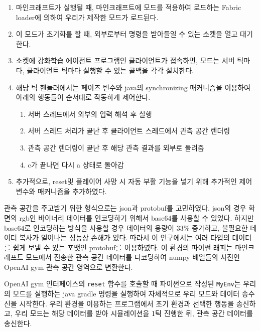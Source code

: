 \documentclass[oneside, under, ko]{snuthesis}
\begin{document}
\begin{enumerate}
    \item 마인크래프트가 실행될 때, 마인크래프트에 모드를 적용하여 로드하는 Fabric loader에 의하여 우리가 제작한 모드가 로드된다.
    \item 이 모드가 초기화를 할 때, 외부로부터 명령을 받아들일 수 있는 소켓을 열고 대기한다.
    \item 소켓에 강화학습 에이전트 프로그램인 클라이언트가 접속하면, 모드는 서버 틱마다, 클라이언트 틱마다 실행할 수 있는 콜백을 각각 설치한다.
    \item 해당 틱 핸들러에서는 페이즈 변수와 java의 synchronizing 매커니즘을 이용하여 아래의 행동들이 순서대로 작동하게 제어한다.
    \begin{enumerate}
        \item 서버 스레드에서 외부의 입력 해석 후 실행
        \item 서버 스레드 처리가 끝난 후 클라이언트 스레드에서 관측 공간 렌더링
        \item 관측 공간 렌더링이 끝난 후 해당 관측 결과를 외부로 돌려줌
        \item c가 끝나면 다시 a 상태로 돌아감
    \end{enumerate}
\item 추가적으로, reset및 플레이어 사망 시 자동 부활 기능을 넣기 위해 추가적인 제어 변수와 매커니즘을 추가하였다.
\end{enumerate}

관측 공간을 주고받기 위한 형식으로는 json과 protobuf를 고민하였다. json의 경우 화면의 rgb인 바이너리 데이터를 인코딩하기 위해서 base64를 사용할 수 있었다. 하지만 base64로 인코딩하는 방식을 사용할 경우 데이터의 용량이 33\% 증가하고, 불필요한 데이터 복사가 일어나는 성능상 손해가 있다. 따라서 이 연구에서는 여러 타입의 데이터를 쉽게 보낼 수 있는 포맷인 protobuf를 이용하였다. 이 환경의 파이썬 래퍼는 마인크래프트 모드에서 전송한 관측 공간 데이터를 디코딩하여 numpy 배열들의 사전인 OpenAI gym 관측 공간 영역으로 변환한다.

OpenAI gym 인터페이스\cite{gym}의 \lstinline{reset} 함수를 호출할 때 파이썬으로 작성된 \lstinline{MyEnv}는 우리의 모드를 실행하는 java gradle 명령을 실행하여 자체적으로 우리 모드와 데이터 송수신을 시작한다. 우리 환경을 이용하는 프로그램에서 초기 환경과 선택한 행동을 송신하고, 우리 모드는 해당 데이터를 받아 시뮬레이션을 1틱 진행한 뒤, 관측 공간 데이터를 송신한다.
\end{document}
